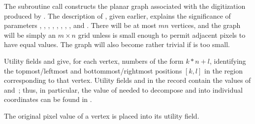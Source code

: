 The subroutine call  constructs
the planar graph associated with the digitization produced by .
The description of , given earlier, explains the significance of
parameters , , , , , ,
, , and . There will
be at most $mn$ vertices, and the graph will be simply an $m\times n$
grid unless  is small enough to permit adjacent pixels to have
equal values. The graph will also become rather trivial if  is
too small.

Utility fields  and  give, for each
vertex,
numbers of the form $k*n+l$, identifying the topmost/leftmost
and bottommost/rightmost positions $[k,l]$ in the region corresponding
to that vertex. Utility fields  and 
in
the  record contain the values of  and~; thus, in
particular,
the value of  needed to decompose  and  into
individual coordinates can be found in .

The original pixel value of a vertex is placed into its 
utility field.

